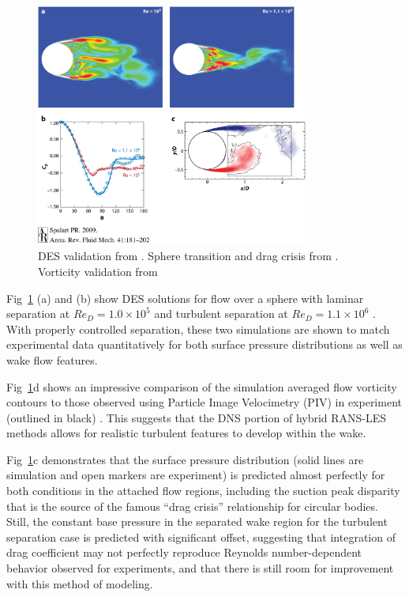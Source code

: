\documentclass[journal]{new-aiaa}
\begin{document}
\begin{figure}[H]
\begin{center}
\includegraphics[width=0.8\textwidth]{Images/logan/spalart2009detachededdy_SphereSeparation.jpeg}
\caption{ DES validation from \cite{spalart2009detachededdy}. Sphere transition and drag crisis from \cite{squires2004detachededdy}.  Vorticity validation from \cite{mockett2008demonstration} }
\label{fig:desspherevalidation}
\end{center}
\end{figure}

Fig~\ref{fig:desspherevalidation} (a) and (b) show DES solutions for flow over a sphere with laminar separation at $Re_D = 1.0 \times 10^5$ and turbulent separation at $Re_D = 1.1 \times 10^6$ \cite{squires2004detachededdy}. With properly controlled separation, these two simulations are shown to match experimental data quantitatively for both surface pressure distributions as well as wake flow features.

Fig~\ref{fig:desspherevalidation}d shows an impressive comparison of the simulation averaged flow vorticity contours to those observed using Particle Image Velocimetry (PIV) in experiment (outlined in black) \cite{mockett2008demonstration}. This suggests that the DNS portion of hybrid RANS-LES methods allows for realistic turbulent features to develop within the wake.

Fig~\ref{fig:desspherevalidation}c demonstrates that the surface pressure distribution (solid lines are simulation and open markers are experiment) is predicted almost perfectly for both conditions in the attached flow regions, including the suction peak disparity that is the source of the famous ``drag crisis'' relationship for circular bodies. Still, the constant base pressure in the separated wake region for the turbulent separation case is predicted with significant offset, suggesting that integration of drag coefficient may not perfectly reproduce Reynolds number-dependent behavior observed for experiments, and that there is still room for improvement with this method of modeling.
\end{document}
